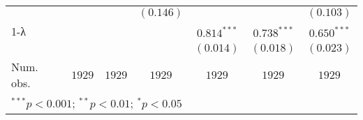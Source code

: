 \begin{table}
\begin{center}
\begin{tabular}{l c c c c c c}
              &                &                & $(0.146)$      &                &                & $(0.103)$      \\
1-λ           &                &                &                & $0.814^{***}$  & $0.738^{***}$  & $0.650^{***}$  \\
              &                &                &                & $(0.014)$      & $(0.018)$      & $(0.023)$      \\
\hline
Num. obs.     & $1929$         & $1929$         & $1929$         & $1929$         & $1929$         & $1929$         \\
\hline
\multicolumn{7}{l}{\scriptsize{$^{***}p<0.001$; $^{**}p<0.01$; $^{*}p<0.05$}}
\end{tabular}
\label{table:coefficients}
\end{center}
\end{table}

